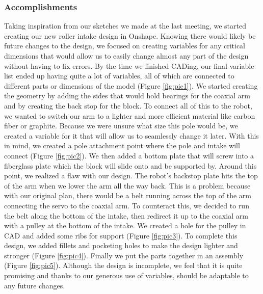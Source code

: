 \subsubsection*{Accomplishments}
Taking inspiration from our sketches we made at the last meeting, we started creating our new roller intake design in Onshape. Knowing there would likely be future changes to the design, we focused on creating variables for any critical dimensions that would allow us to easily change almost any part of the design without having to fix errors. By the time we finished CADing, our final variable list ended up having quite a lot of variables, all of which are connected to different parts or dimensions of the model (Figure \ref{fig:pic1}). We started creating the geometry by adding the sides that would hold bearings for the coaxial arm and by creating the back stop for the block. To connect all of this to the robot, we wanted to switch our arm to a lighter and more efficient material like carbon fiber or graphite. Because we were unsure what size this pole would be, we created a variable for it that will allow us to seamlessly change it later. With this in mind, we created a pole attachment point where the pole and intake will connect (Figure \ref{fig:pic2}).  We then added a bottom plate that will screw into a fiberglass plate which the block will slide onto and be supported by. Around this point, we realized a flaw with our design. The robot's backstop plate hits the top of the arm when we lower the arm all the way back. This is a problem because with our original plan, there would be a belt running across the top of the arm connecting the servo to the coaxial arm. To counteract this, we decided to run the belt along the bottom of the intake, then redirect it up to the coaxial arm with a pulley at the bottom of the intake. We created a hole for the pulley in CAD and added some ribs for support (Figure \ref{fig:pic3}). To complete this design, we added fillets and pocketing holes to make the design lighter and stronger (Figure \ref{fig:pic4}). Finally we put the parts together in an assembly (Figure \ref{fig:pic5}). Although the design is incomplete, we feel that it is quite promising and thanks to our generous use of variables, should be adaptable to any future changes.

 

